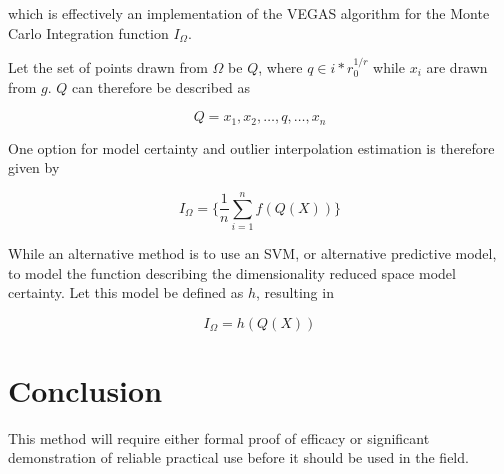 \documentclass[a4paperpaper,twocolumn]{article}
\begin{document}
which is effectively an implementation of the VEGAS algorithm for the Monte Carlo Integration function $I_\Omega$.

Let the set of points drawn from $\Omega$ be $Q$, where $q \in {i*r}^{1/r}_0$ while $x_i$ are drawn from $g$. $Q$ can therefore be described as

$$Q = {x_1, x_2, \ldots, q, \ldots, x_n}$$

One option for model certainty and outlier interpolation estimation is therefore given by

$$I_\Omega = \{\frac{1}{n} \sum^n_{i=1} f(Q(X))\}$$

While an alternative method is to use an SVM, or alternative predictive model, to model the function describing the dimensionality reduced space model certainty. Let this model be defined as $h$, resulting in

$$I_\Omega = h(Q(X))$$

\section{Conclusion}\label{Conclusion}

This method will require either formal proof of efficacy or significant demonstration of reliable practical use before it should be used in the field.

\printbibliography
\end{document}
